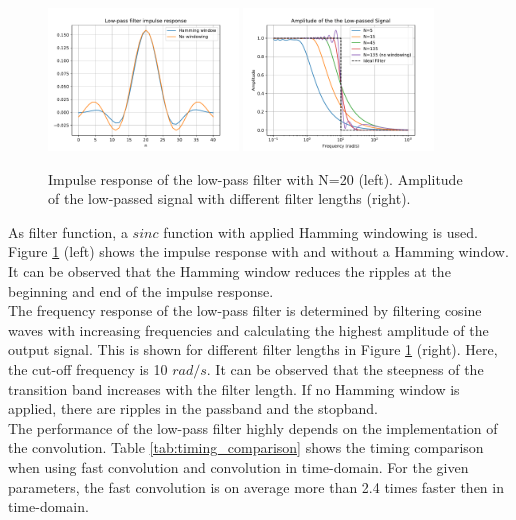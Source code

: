 \documentclass[12pt, a4paper]{report}
\begin{document}
\begin{figure}[h!]
	\centering
	\includegraphics[width=0.45\textwidth]{figures/impulse_response.pdf}
	\includegraphics[width=0.45\textwidth]{figures/passband.pdf}
	\caption{Impulse response of the low-pass filter with N=20 (left). Amplitude of the low-passed signal with different filter lengths (right).}
	\label{fig:low_pass_filter}
\end{figure}
\noindent As filter function, a \(sinc\) function with applied Hamming windowing is used. Figure \ref{fig:low_pass_filter} (left) shows the impulse response with and without a Hamming window. It can be observed that the Hamming window reduces the ripples at the beginning and end of the impulse response.\\
The frequency response of the low-pass filter is determined by filtering cosine waves with increasing frequencies and calculating the highest amplitude of the output signal. This is shown for different filter lengths in Figure \ref{fig:low_pass_filter} (right). Here, the cut-off frequency is 10 \({rad}/s\).
It can be observed that the steepness of the transition band increases with the filter length. If no Hamming window is applied, there are ripples in the passband and the stopband.\\
The performance of the low-pass filter highly depends on the implementation of the convolution. Table \ref{tab:timing_comparison} shows the timing comparison when using fast convolution and convolution in time-domain. For the given parameters, the fast convolution is on average more than 2.4 times faster then in time-domain.
\end{document}
